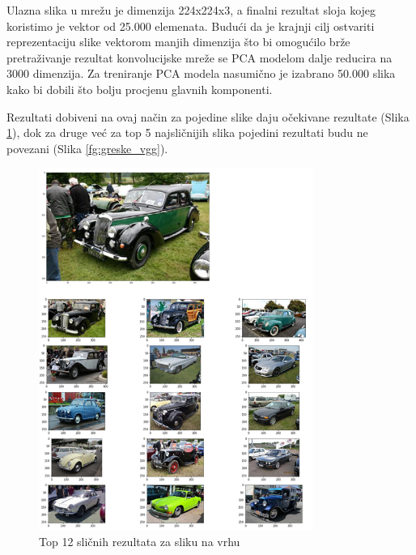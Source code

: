 \documentclass[times, utf8, proizvoljni, numeric]{fer}
\begin{document}
Ulazna slika u mrežu je dimenzija 224x224x3, a finalni rezultat sloja kojeg koristimo je vektor od 25.000 elemenata. Budući da je krajnji cilj ostvariti reprezentaciju slike vektorom manjih dimenzija što bi omogućilo brže pretraživanje rezultat konvolucijske mreže se PCA modelom dalje reducira na 3000 dimenzija. Za treniranje PCA modela nasumično je izabrano 50.000 slika kako bi dobili što bolju procjenu glavnih komponenti.

Rezultati dobiveni na ovaj način za pojedine slike daju očekivane rezultate  (Slika \ref{fg:auti_vgg}), dok za druge već za top 5 najsličnijih slika pojedini rezultati budu ne povezani (Slika \ref{fg:greske_vgg}). 

\begin{figure}[!ht]
	\begin{center}
		\captionsetup{justification=centering}
		\includegraphics[width=0.8\textwidth]{./imgs/auti_vgg.png}
		\caption{Top 12 sličnih rezultata za sliku na vrhu}
		\label{fg:auti_vgg}
	\end{center}
\end{figure}
\end{document}
